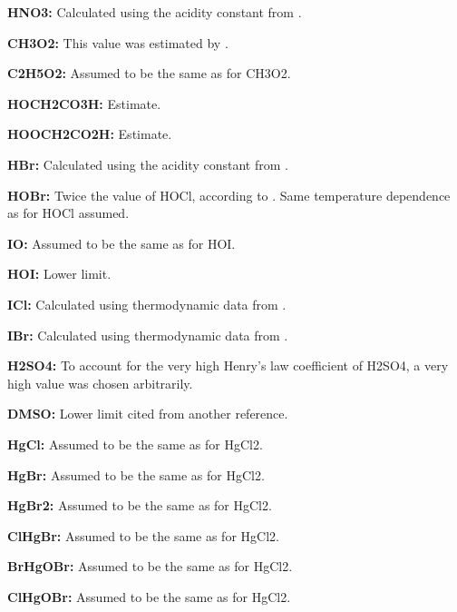 \item {\bf  HNO3:} Calculated using the acidity constant from \citet  {450}.
\item {\bf  CH3O2:} This value was estimated by \citet  {46}.
\item {\bf  C2H5O2:} Assumed to be the same as for CH3O2.
\item {\bf  HOCH2CO3H:} Estimate.
\item {\bf  HOOCH2CO2H:} Estimate.
\item {\bf  HBr:} Calculated using the acidity constant from \citet  {194}.
\item {\bf  HOBr:} Twice the value of HOCl, according to \citet  {288}. Same temperature dependence as for HOCl assumed.
\item {\bf  IO:} Assumed to be the same as for HOI.
\item {\bf  HOI:} Lower limit.
\item {\bf  ICl:} Calculated using thermodynamic data from \citet  {489}.
\item {\bf  IBr:} Calculated using thermodynamic data from \citet  {489}.
\item {\bf  H2SO4:} To account for the very high Henry's law coefficient of H2SO4, a very high value was chosen arbitrarily.
\item {\bf  DMSO:} Lower limit cited from another reference.
\item {\bf  HgCl:} Assumed to be the same as for HgCl2.
\item {\bf  HgBr:} Assumed to be the same as for HgCl2.
\item {\bf  HgBr2:} Assumed to be the same as for HgCl2.
\item {\bf  ClHgBr:} Assumed to be the same as for HgCl2.
\item {\bf  BrHgOBr:} Assumed to be the same as for HgCl2.
\item {\bf  ClHgOBr:} Assumed to be the same as for HgCl2.
